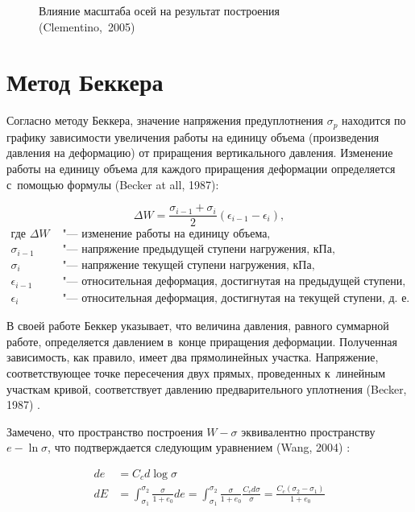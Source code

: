  \begin{figure}
    \centering
    \small
    
    \caption{Влияние масштаба осей на результат построения (Clementino,~2005)~\cite{clementino2005}}
    \label{fig:ellipse}
\end{figure}
    
\section{Метод Беккера}

Согласно методу Беккера, значение напряжения предуплотнения $\sigma_p$ находится по графику зависимости увеличения работы на единицу объема (произведения давления на деформацию) от приращения вертикального давления.
Изменение работы на единицу объема для каждого приращения деформации определяется с~помощью формулы (Becker at all, 1987)\cite{becker1987}:

\begin{equation}
  \label{eq:deltaw}
  \Delta W = \frac{\sigma_{i-1} + \sigma_i}{2} (\epsilon_{i-1} - \epsilon_i),
\end{equation}
\begin{align*}
  \text{где }
  \Delta W & 
  \text{ "--- изменение работы на единицу объема,} \\
  \sigma_{i-1} & 
  \text{ "--- напряжение предыдущей ступени нагружения, кПа,} \\
  \sigma_i & 
  \text{ "--- напряжение текущей ступени нагружения, кПа,} \\
  \epsilon_{i-1} & 
  \text{ "--- относительная деформация, достигнутая на предыдущей ступени, д.~е.,} \\
  \epsilon_i & 
  \text{ "--- относительная деформация, достигнутая на текущей ступени, д.~е.}
\end{align*}

В своей работе Беккер указывает, что величина давления, равного суммарной работе, определяется давлением в~конце приращения деформации. 
Полученная зависимость, как правило, имеет два прямолинейных участка. 
Напряжение, соответствующее точке пересечения двух прямых, проведенных к~линейным участкам кривой, соответствует давлению предварительного уплотнения (Becker, 1987) \cite{becker1987}.

Замечено, что пространство построения $W - \sigma$ эквивалентно пространству $e - \ln \sigma$, что подтверждается следующим уравнением (Wang, 2004) \cite{wang2004}: 


\begin{subequations}
  \label{eq:Maxwell}
  \begin{align}
    \label{eq:eqw_1}
    de & = C_c d \log\sigma \\
    \label{eq:eqw_2}
    dE & = \int_{\sigma_1}^{\sigma_2} \frac{\sigma}{1+e_0} de 
    = \int_{\sigma_1}^{\sigma_2} \frac{\sigma}{1+e_0} \frac{C_c d\sigma}{\sigma}
    = \frac{C_c (\sigma_2-\sigma_1)}{1+e_0}
  \end{align}
\end{subequations}

